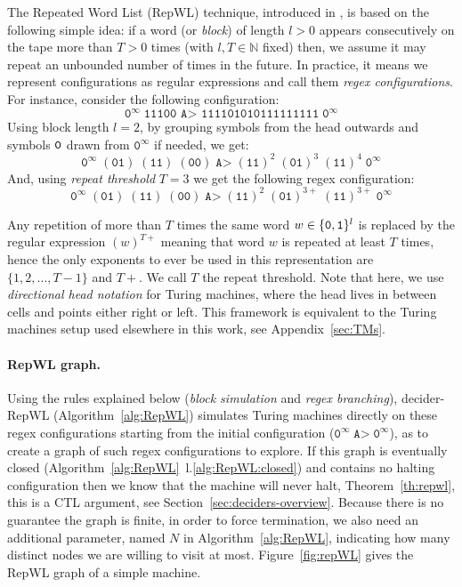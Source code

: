 The Repeated Word List (RepWL) technique, introduced in \CoqBB, is based on the following simple idea: if a word (or \textit{block}) of length $l > 0$ appears consecutively on the tape more than $T > 0$ times (with $l, T \in \mathbb{N}$ fixed) then, we assume it may repeat an unbounded number of times in the future. In practice, it means we represent configurations as regular expressions and call them \textit{regex configurations}. For instance, consider the following configuration:
$$ \texttt{0}^\infty \; \texttt{11100 A> 111101010111111111} \; \texttt{0}^\infty$$
Using block length $l=2$, by grouping symbols from the head outwards and symbols $\texttt{0}$ drawn from $\texttt{0}^\infty$ if needed, we get:
$$ \texttt{0}^\infty \; (\texttt{01}) \; (\texttt{11}) \; (\texttt{00}) \; \texttt{A>} \; (\texttt{11})^2 \; (\texttt{01})^{3} \; (\texttt{11})^{4} \; \texttt{0}^\infty $$
And, using \textit{repeat threshold} $T=3$ we get the following regex configuration:
$$ \texttt{0}^\infty \; (\texttt{01}) \; (\texttt{11}) \; (\texttt{00}) \; \texttt{A>} \; (\texttt{11})^2 \; (\texttt{01})^{3+} \; (\texttt{11})^{3+} \; \texttt{0}^\infty $$

Any repetition of more than $T$ times the same word $w \in \{\texttt{0},\texttt{1}\}^l$ is replaced by the regular expression $(w)^{T+}$ meaning that word $w$ is repeated at least $T$ times, hence the only exponents to ever be used in this representation are $\{1,2,\dots,T-1\}$ and $T+$. We call $T$ the repeat threshold. Note that here, we use \textit{directional head notation} for Turing machines, where the head lives in between cells and points either right or left. This framework is equivalent to the Turing machines setup used elsewhere in this work, see Appendix~\ref{sec:TMs}.

\paragraph{RepWL graph.} Using the rules explained below (\textit{block simulation} and \textit{regex branching}), {\sc decider-RepWL} (Algorithm~\ref{alg:RepWL}) simulates Turing machines directly on these regex configurations starting from the initial configuration (\ie $\texttt{0}^\infty \; \texttt{A>} \; \texttt{0}^\infty$), as to create a graph of such regex configurations to explore. If this graph is eventually closed (Algorithm~\ref{alg:RepWL}~l.\ref{alg:RepWL:closed}) and contains no halting configuration then we know that the machine will never halt, Theorem~\ref{th:repwl}, this is a CTL argument, see Section~\ref{sec:deciders-overview}. Because there is no guarantee the graph is finite, in order to force termination, we also need an additional parameter, named $N$ in Algorithm~\ref{alg:RepWL}, indicating how many distinct nodes we are willing to visit at most. Figure~\ref{fig:repWL} gives the RepWL graph of a simple machine.

